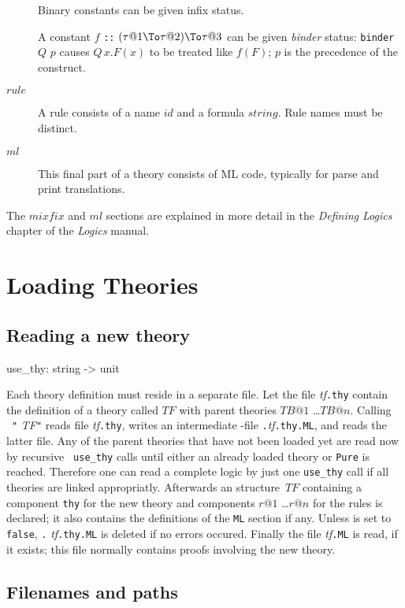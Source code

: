 \begin{description}
  Binary constants can be given infix status.

  A constant $f$ {\tt::} $(\tau@1\To\tau@2)\To\tau@3$ can be given {\em
    binder} status: {\tt binder} $Q$ $p$ causes $Q\,x.F(x)$ to be treated
  like $f(F)$; $p$ is the precedence of the construct.
\item[$rule$] A rule consists of a name $id$ and a formula $string$.  Rule
  names must be distinct.
\item[$ml$] This final part of a theory consists of ML code, 
  typically for parse and print translations.
\end{description}
The $mixfix$ and $ml$ sections are explained in more detail in the {\it
Defining Logics} chapter of the {\it Logics} manual.

\section{Loading Theories}
\label{LoadingTheories}
\subsection{Reading a new theory}

\begin{ttbox} 
use_thy: string -> unit
\end{ttbox}
Each theory definition must reside in a separate file.  Let the file {\it
  tf}{\tt.thy} contain the definition of a theory called $TF$ with parent
theories $TB@1$ \dots $TB@n$.  Calling ~{\tt"}{\it
  TF\/}{\tt"} reads file {\it tf}{\tt.thy}, writes an intermediate {\ML}-file
{\tt.}{\it tf}{\tt.thy.ML}, and reads the latter file.  Any of the parent
theories that have not been loaded yet are read now by recursive {\tt
  use_thy} calls until either an already loaded theory or {\tt Pure} is
reached.  Therefore one can read a complete logic by just one {\tt use_thy}
call if all theories are linked appropriatly.  Afterwards an {\ML}
structure~$TF$ containing a component {\tt thy} for the new theory and
components $r@1$ \dots $r@n$ for the rules is declared; it also contains the
definitions of the {\tt ML} section if any. Unless
 is set to {\tt false}, {\tt.}{\it
  tf}{\tt.thy.ML} is deleted if no errors occured. Finally the file {\it
  tf}{\tt.ML} is read, if it exists; this file normally contains proofs
involving the new theory.


\subsection{Filenames and paths}

